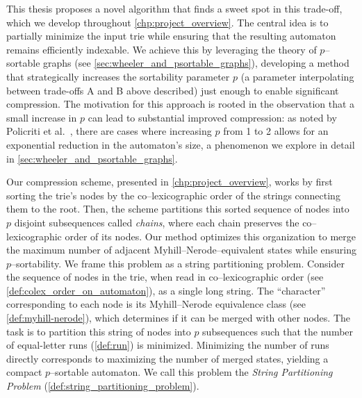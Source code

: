 This thesis proposes a novel algorithm that finds a sweet spot in this trade-off, which we develop throughout \cref{chp:project_overview}. The central idea is to partially minimize the input trie while ensuring that the resulting automaton remains efficiently indexable. We achieve this by leveraging the theory of $p$--sortable graphs (see \cref{sec:wheeler_and_psortable_graphs}), developing a method that strategically increases the sortability parameter $p$ (a parameter interpolating between trade-offs A and B above described) just enough to enable significant compression. The motivation for this approach is rooted in the observation that a small increase in $p$ can lead to substantial improved compression: as noted by Policriti et al.~\cite{manziniRationalConstructionWheeler2024}, there are cases where increasing $p$ from 1 to 2 allows for an exponential reduction in the automaton's size, a phenomenon we explore in detail in \cref{sec:wheeler_and_psortable_graphs}.

Our compression scheme, presented in \cref{chp:project_overview}, works by first sorting the trie's nodes by the co--lexicographic order of the strings connecting them to the root. Then, the scheme partitions this sorted sequence of nodes into $p$ disjoint subsequences called \emph{chains}, where each chain preserves the co--lexicographic order of its nodes. Our method optimizes this organization to merge the maximum number of adjacent Myhill--Nerode--equivalent states while ensuring $p$--sortability. 
We frame this problem as a string partitioning problem. Consider the sequence of nodes in the trie, when read in co--lexicographic order (see \cref{def:colex_order_on_automaton}), as a single long string. The ``character'' corresponding to each node is its Myhill--Nerode equivalence class (see \cref{def:myhill-nerode}), which determines if it can be merged with other nodes. The task is to partition this string of nodes into $p$ subsequences such that the number of equal-letter runs (\cref{def:run}) is minimized. Minimizing the number of runs directly corresponds to maximizing the number of merged states, yielding a compact $p$--sortable automaton. We call this problem the \emph{String Partitioning Problem} (\cref{def:string_partitioning_problem}).

